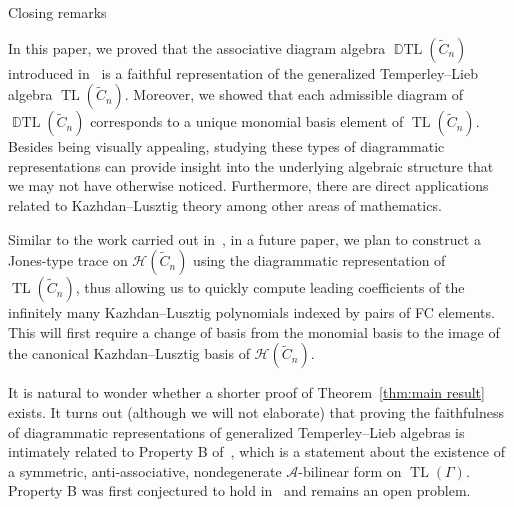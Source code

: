 \documentclass[11pt]{amsart}
\theoremstyle{definition}
\numberwithin{equation}{section}
\newcommand{\A}{\mathcal{A}}
\newcommand{\C}{\widetilde{C}}
\DeclareMathOperator{\TL}{TL}
\DeclareMathOperator{\DTL}{\mathbb{D}TL}
\renewcommand{\(}{\left(}
\renewcommand{\)}{\right)}
\renewcommand{\H}{\mathcal{H}}
\begin{document}
\begin{section}{Closing remarks}\label{sec:closing}

In this paper, we proved that the associative diagram algebra $\DTL(\C_n)$ introduced in~\cite{Ernst2012} is a faithful representation of the generalized Temperley--Lieb algebra $\TL(\C_n)$.  Moreover, we showed that each admissible diagram of $\DTL(\C_n)$ corresponds to a unique monomial basis element of $\TL(\C_n)$.  Besides being visually appealing, studying these types of diagrammatic representations can provide insight into the underlying algebraic structure that we may not have otherwise noticed.  Furthermore, there are direct applications related to Kazhdan--Lusztig theory among other areas of mathematics.

Similar to the work carried out in~\cite{Green2007a,Green2007}, in a future paper, we plan to construct a Jones-type trace on $\H(\C_n)$ using the diagrammatic representation of $\TL(\C_n)$, thus allowing us to quickly compute leading coefficients of the infinitely many Kazhdan--Lusztig polynomials indexed by pairs of FC elements. This will first require a change of basis from the monomial basis to the image of the canonical Kazhdan--Lusztig basis of $\H(\C_n)$.

It is natural to wonder whether a shorter proof of Theorem~\ref{thm:main result} exists.  It turns out (although we will not elaborate) that proving the faithfulness of diagrammatic representations of generalized Temperley--Lieb algebras is intimately related to Property B of~\cite{Green2007a}, which is a statement about the existence of a symmetric, anti-associative, nondegenerate $\A$-bilinear form on $\TL(\Gamma)$.  Property B was first conjectured to hold in~\cite{Green2001} and remains an open problem.

\end{section}






\end{document}
